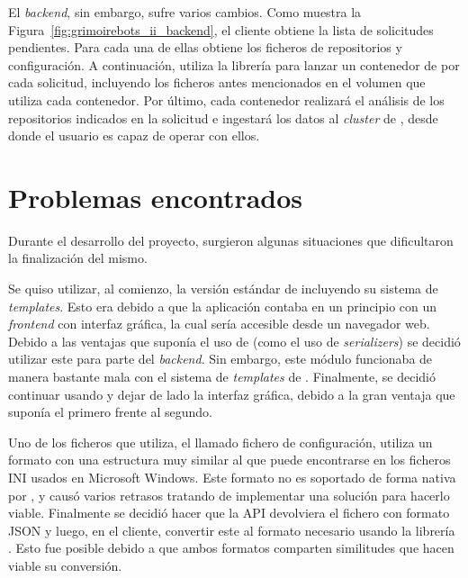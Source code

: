 El \emph{backend}, sin embargo, sufre varios cambios. Como muestra la Figura~\ref{fig:grimoirebots_ii_backend}, el cliente obtiene la lista de solicitudes pendientes. Para cada una de ellas obtiene los ficheros de repositorios y configuración. A continuación, utiliza la librería  para lanzar un contenedor de  por cada solicitud, incluyendo los ficheros antes mencionados en el volumen que utiliza cada contenedor. Por último, cada contenedor realizará el análisis de los repositorios indicados en la solicitud e ingestará los datos al \emph{cluster} de , desde donde el usuario es capaz de operar con ellos.


\section{Problemas encontrados}\label{problemas-encontrados}

Durante el desarrollo del proyecto, surgieron algunas situaciones que dificultaron la finalización del mismo.

Se quiso utilizar, al comienzo, la versión estándar de  incluyendo su sistema de \emph{templates}. Esto era debido a que la aplicación contaba en un principio con un \emph{frontend} con interfaz gráfica, la cual sería accesible desde un navegador web. Debido a las ventajas que suponía el uso de  (como el uso de \emph{serializers}) se decidió utilizar este para parte del \emph{backend}. Sin embargo, este módulo funcionaba de manera bastante mala con el sistema de \emph{templates} de . Finalmente, se decidió continuar usando  y dejar de lado la interfaz gráfica, debido a la gran ventaja que suponía el primero frente al segundo.

Uno de los ficheros que  utiliza, el llamado fichero de configuración, utiliza un formato con una estructura muy similar al que puede encontrarse en los ficheros INI usados en Microsoft Windows. Este formato no es soportado de forma nativa por , y causó varios retrasos tratando de implementar una solución para hacerlo viable. Finalmente se decidió hacer que la API devolviera el fichero con formato JSON y luego, en el cliente, convertir este al formato necesario usando la librería . Esto fue posible debido a que ambos formatos comparten similitudes que hacen viable su conversión.

